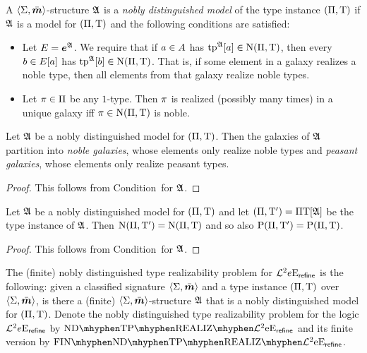 \begin{definition}
A $\left\langle \mathrm{\Sigma},\bar{\bm{m}} \right\rangle$-structure $\mathfrak{A}$ is a \emph{nobly distinguished model} of
the type instance $(\Pi,\mathrm{T})$ if $\mathfrak{A}$ is a model for $(\Pi,\mathrm{T})$
and the following conditions are satisfied:
\begin{itemize}
  \item[\condrealizd]\label{cond:realizd}
  Let $E = \bm{e}^{\mathfrak{A}}$. We require that if $a \in
  A$ has $\operatorname{tp}^{\mathfrak{A}}[a] \in \mathrm{\mathrm{N}}(\Pi,\mathrm{T})$, then every $b \in E[a]$
  has $\operatorname{tp}^{\mathfrak{A}}[b] \in \mathrm{\mathrm{N}}(\Pi,\mathrm{T})$. That is, if some element in a galaxy
  realizes a noble type, then all elements from that galaxy realize noble types.
  \item[\condrealizn]\label{cond:realizn}
  Let $\pi \in \Pi$ be any $1$-type. Then $\pi$ is realized
  (possibly many times) in a unique galaxy iff $\pi \in \mathrm{\mathrm{N}}(\Pi,\mathrm{T})$ is
  noble.
\end{itemize}
\end{definition}
\begin{remark}\label{rem:ndis-split}
Let $\mathfrak{A}$ be a nobly distinguished model for $(\Pi,\mathrm{T})$. 
Then the galaxies of $\mathfrak{A}$ partition into \emph{noble galaxies}, whose
elements only realize noble types and \emph{peasant galaxies}, whose elements only realize peasant types.
\end{remark}
\begin{proof}
This follows from Condition~ for $\mathfrak{A}$.
\end{proof}
\begin{remark}\label{rem:ndis-noble-exact}
Let $\mathfrak{A}$ be a nobly distinguished model for $(\Pi,\mathrm{T})$ and let
$(\Pi,{\mathrm{T}'}) = \Pi\mathrm{T}[\mathfrak{A}]$ be the type instance of $\mathfrak{A}$.
Then $\mathrm{\mathrm{N}}(\Pi,{\mathrm{T}'}) = \mathrm{\mathrm{N}}(\Pi,\mathrm{T})$ and so also $\mathrm{P}(\Pi,{\mathrm{T}'}) =
\mathrm{P}(\Pi,\mathrm{T})$.
\end{remark}
\begin{proof}
This follows from Condition~ for $\mathfrak{A}$.
\end{proof}

\begin{definition}
The (finite) nobly distinguished type realizability problem for
$\mathcal{L}^{2}{e}\mathrm{E}_{\mathsf{refine}}$ is the following: given a classified signature
$\left\langle \mathrm{\Sigma},\bar{\bm{m}} \right\rangle$ and a type instance $(\Pi,\mathrm{T})$ over $\left\langle \mathrm{\Sigma},\bar{\bm{m}} \right\rangle$,
is there a (finite) $\left\langle \mathrm{\Sigma},\bar{\bm{m}} \right\rangle$-structure $\mathfrak{A}$ that is a nobly
distinguished model for $(\Pi,\mathrm{T})$. Denote the nobly distinguished type
realizability problem for the logic $\mathcal{L}^{2}{e}\mathrm{E}_{\mathsf{refine}}$ by
$\NDReal{\vFo2\Eea\sze\agrefine}$ and its finite version by
$\FinNDReal{\vFo2\Eea\sze\agrefine}$.
\end{definition}


